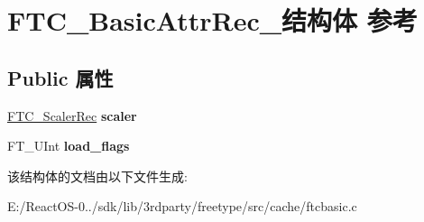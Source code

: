 \hypertarget{struct_f_t_c___basic_attr_rec__}{}\section{F\+T\+C\+\_\+\+Basic\+Attr\+Rec\+\_\+结构体 参考}
\label{struct_f_t_c___basic_attr_rec__}
\subsection*{Public 属性}
\begin{DoxyCompactItemize}
\item 
\mbox{\label{struct_f_t_c___basic_attr_rec___ab3359e99e0f59bcea12cc9170ad5c468}} 
\hyperlink{struct_f_t_c___scaler_rec__}{F\+T\+C\+\_\+\+Scaler\+Rec} {\bfseries scaler}
\item 
\mbox{\label{struct_f_t_c___basic_attr_rec___afd78c0b0721e52b4dd29caf52510a84d}} 
F\+T\+\_\+\+U\+Int {\bfseries load\+\_\+flags}
\end{DoxyCompactItemize}


该结构体的文档由以下文件生成\+:\begin{DoxyCompactItemize}
\item 
E\+:/\+React\+O\+S-\/0../sdk/lib/3rdparty/freetype/src/cache/ftcbasic.\+c\end{DoxyCompactItemize}
